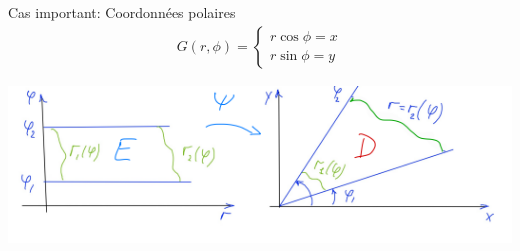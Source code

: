 \begin{parag}{Cas important: Coordonnées polaires}
    \begin{align*} G \left( r, \phi\right) =  
        \begin{cases}
            r  \cos \phi =  x\\
            r \sin \phi =  y
        \end{cases}
    \end{align*}
    \begin{center}
        \includegraphics[scale=0.8]{32025-05-21.png}
    \end{center}
\end{parag}
